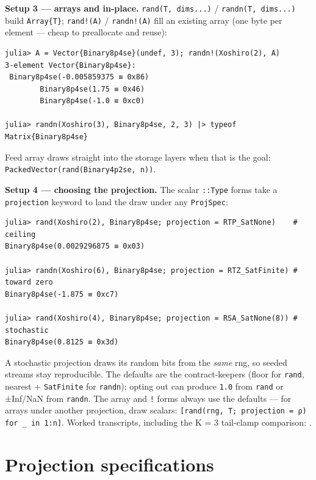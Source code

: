 \textbf{Setup 3 — arrays and in-place.} \texttt{rand(T, dims...)} / \texttt{randn(T, dims...)} build \texttt{Array\{T\}}; \texttt{rand!(A)} / \texttt{randn!(A)} fill an existing array (one byte per element — cheap to preallocate and reuse):




\begin{verbatim}
julia> A = Vector{Binary8p4se}(undef, 3); randn!(Xoshiro(2), A)
3-element Vector{Binary8p4se}:
 Binary8p4se(-0.005859375 ≡ 0x86)
        Binary8p4se(1.75 ≡ 0x46)
        Binary8p4se(-1.0 ≡ 0xc0)

julia> randn(Xoshiro(3), Binary8p4se, 2, 3) |> typeof
Matrix{Binary8p4se}
\end{verbatim}



Feed array draws straight into the storage layers when that is the goal: \texttt{PackedVector(rand(Binary4p2se, n))}.



\textbf{Setup 4 — choosing the projection.} The scalar \texttt{::Type} forms take a \texttt{projection} keyword to land the draw under any \texttt{ProjSpec}:




\begin{verbatim}
julia> rand(Xoshiro(2), Binary8p4se; projection = RTP_SatNone)    # ceiling
Binary8p4se(0.0029296875 ≡ 0x03)

julia> randn(Xoshiro(6), Binary8p4se; projection = RTZ_SatFinite) # toward zero
Binary8p4se(-1.875 ≡ 0xc7)

julia> rand(Xoshiro(4), Binary8p4se; projection = RSA_SatNone(8)) # stochastic
Binary8p4se(0.8125 ≡ 0x3d)
\end{verbatim}



A stochastic projection draws its random bits from the \emph{same} rng, so seeded streams stay reproducible. The defaults are the contract-keepers (floor for \texttt{rand}, nearest + \texttt{SatFinite} for \texttt{randn}); opting out can produce \texttt{1.0} from \texttt{rand} or ±Inf/NaN from \texttt{randn}. The array and \texttt{!} forms always use the defaults — for arrays under another projection, draw scalars: \texttt{[rand(rng, T; projection = ρ) for \_ in 1:n]}. Worked transcripts, including the K = 3 tail-clamp comparison: .



\section{Projection specifications}



